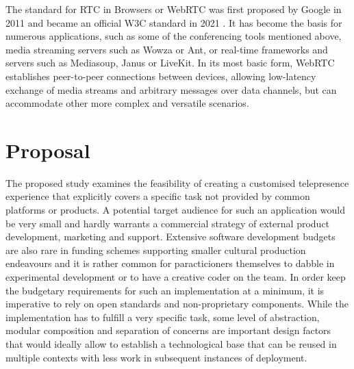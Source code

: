 The standard for \ac{RTC} in Browsers or \ac{WebRTC} \parencite{webRtcSpec} was first proposed by Google in 2011 and became an official \ac{W3C} standard in 2021 \parencite{webRtcOfficialWebStandard}.
It has become the basis for numerous applications, such as some of the conferencing tools mentioned above, media streaming servers such as Wowza or Ant, or real-time frameworks and servers such as Mediasoup, Janus or LiveKit.
In its most basic form, \ac{WebRTC} establishes peer-to-peer connections between devices, allowing low-latency exchange of media streams and arbitrary messages over data channels, but can accommodate other more complex and versatile scenarios.

\section{Proposal}

The proposed study examines the feasibility of creating a customised telepresence experience that explicitly covers a specific task not provided by common platforms or products.
A potential target audience for such an application would be very small and hardly warrants a commercial strategy of external product development, marketing and support.
Extensive software development budgets are also rare in funding schemes supporting smaller cultural production endeavours and it is rather common for paracticioners themselves to dabble in experimental development or to have a creative coder on the team.
In order keep the budgetary requirements for such an implementation at a minimum, it is imperative to rely on open standards and non-proprietary components.
While the implementation has to fulfill a very specific task, some level of abstraction, modular composition and separation of concerns are important design factors that would ideally allow to establish a technological base that can be reused in multiple contexts with less work in subsequent instances of deployment.

